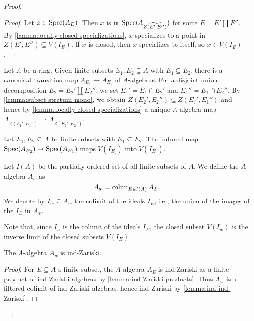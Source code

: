 \begin{proof}
\begin{proof}
    Let $x \in \mathrm{Spec}(A_E)$. Then $x$ is in $\mathrm{Spec}(A_{\widetilde{Z(E', E'')}})$ for some
    $E = E' \coprod E''$. By
    \ref{lemma:locally-closed-specializations}, $x$ specializes to a point
    in $Z(E', E'') \subseteq V(I_E)$.
    If $x$ is closed, then $x$ specializes to itself, so $x \in V(I_E)$.
\end{proof}

Let $A$ be a ring. Given finite subsets $E_1, E_2 \subseteq A$ with $E_1 \subseteq E_2$, there is a
canonical transition map $A_{E_1} \to A_{E_2}$ of $A$-algebras: For
a disjoint union decomposition $E_2 = E_2' \coprod E_2''$, we set
$E_1' = E_1 \cap E_2'$ and $E_1'' = E_1 \cap E_2''$. By \ref{lemma:subset-stratum-mono},
we obtain $Z(E_2', E_2'') \subseteq Z(E_1', E_1'')$ and hence
by \ref{lemma:locally-closed-specializations} a unique $A$-algebra map
$A_{\widetilde{Z(E_1', E_1'')}} \to A_{\widetilde{Z(E_2', E_2'')}}$.

\begin{lemma}
    Let $E_1, E_2 \subseteq A$ be finite subsets with $E_1 \subseteq E_2$.
    The induced map $\mathrm{Spec}(A_{E_2}) \to \mathrm{Spec}(A_{E_1})$ maps
    $V(I_{E_2})$ into $V(I_{E_1})$.
    \label{lemma:finite-stratification-map-closed}
\end{lemma}

\begin{definition}
    Let $I(A)$ be the partially ordered set of all finite subsets of $A$. We define the
    $A$-algebra $A_{w}$ as
    \[
    A_w = \operatorname{colim}_{E \in I(A)} A_E
    .\]
    We denote by $I_w \subseteq A_w$ the colimit of the ideals $I_E$, i.e.,
    the union of the images of the $I_E$ in $A_w$.%
    \label{def:w-localization}
\end{definition}

Note that, since $I_w$ is the colimit of the ideals $I_E$, the closed subset
$V(I_w)$ is the inverse limit of the closed subsets $V(I_E)$.

\begin{lemma}
    The $A$-algebra $A_{w}$ is ind-Zariski.
    \label{lemma:w-localization-ind-Zariski}
\end{lemma}

\begin{proof}
    For $E \subseteq A$ a finite subset, the $A$-algebra $A_E$ is ind-Zariski
    as a finite product of ind-Zariski algebras by \ref{lemma:ind-Zariski-products}.
    Thus $A_w$ is a filtered colimit of ind-Zariski algebras, hence ind-Zariski
    by \ref{lemma:ind-ind-Zariski}.
\end{proof}


\end{proof}

